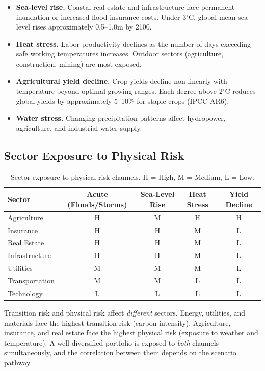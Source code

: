 \documentclass[11pt, a4paper]{article}
\theoremstyle{definition}
\theoremstyle{plain}
\theoremstyle{remark}
\begin{document}
\begin{itemize}
    \item \textbf{Sea-level rise.} Coastal real estate and infrastructure face
          permanent inundation or increased flood insurance costs.
          Under 3$^\circ$C, global mean sea level rises approximately 0.5--1.0m
          by 2100.
    \item \textbf{Heat stress.} Labor productivity declines as the number of
          days exceeding safe working temperatures increases.
          Outdoor sectors (agriculture, construction, mining) are most exposed.
    \item \textbf{Agricultural yield decline.} Crop yields decline non-linearly
          with temperature beyond optimal growing ranges.
          Each degree above 2$^\circ$C reduces global yields by approximately
          5--10\% for staple crops (IPCC AR6).
    \item \textbf{Water stress.} Changing precipitation patterns affect
          hydropower, agriculture, and industrial water supply.
\end{itemize}

\subsection{Sector Exposure to Physical Risk}

\begin{table}[H]
\centering
\caption{Sector exposure to physical risk channels.
H = High, M = Medium, L = Low.}
\label{tab:physical-exposure}
\begin{tabular}{@{}lcccc@{}}
\toprule
\textbf{Sector} & \textbf{Acute (Floods/Storms)} & \textbf{Sea-Level Rise} &
\textbf{Heat Stress} & \textbf{Yield Decline} \\
\midrule
Agriculture       & H & M & H & H \\
Insurance         & H & H & M & L \\
Real Estate       & H & H & M & L \\
Infrastructure    & H & H & M & L \\
Utilities         & M & M & M & L \\
Transportation    & M & M & L & L \\
Technology        & L & L & L & L \\
\bottomrule
\end{tabular}
\end{table}

\begin{keyresult}
Transition risk and physical risk affect \emph{different} sectors.
Energy, utilities, and materials face the highest transition risk (carbon
intensity).
Agriculture, insurance, and real estate face the highest physical risk
(exposure to weather and temperature).
A well-diversified portfolio is exposed to \emph{both} channels simultaneously,
and the correlation between them depends on the scenario pathway.
\end{keyresult}
\end{document}
